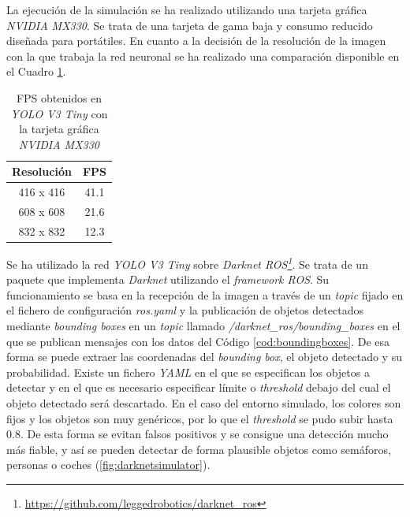 La ejecución de la simulación se ha realizado utilizando una tarjeta gráfica \textit{NVIDIA MX330}. Se trata de una tarjeta de gama baja y consumo reducido diseñada para portátiles. En cuanto a la decisión de la resolución de la imagen con la que trabaja la red neuronal se ha realizado una comparación disponible en el Cuadro \ref{table:versusnotebook}.\\

\begin{table}[H]
	\begin{center}
		\begin{tabular}{|c|c|}
			\hline
			\textbf{Resolución} & \textbf{FPS}
			\\
			\hline
			416 x 416           & 41.1
			\\
			608 x 608           & 21.6
			\\
			832 x 832           & 12.3
			\\
			\hline
		\end{tabular}
		\caption{FPS obtenidos en \textit{YOLO V3 Tiny} con la tarjeta gráfica \textit{NVIDIA MX330}}
		\label{table:versusnotebook}
	\end{center}
\end{table}

Se ha utilizado la red \textit{YOLO V3 Tiny} sobre \textit{Darknet ROS\footnote{\url{https://github.com/leggedrobotics/darknet_ros}}}. Se trata de un paquete que implementa \textit{Darknet} utilizando el \textit{framework ROS}. Su funcionamiento se basa en la recepción de la imagen a través de un \textit{topic} fijado en el fichero de configuración \textit{ros.yaml} y la publicación de objetos detectados mediante \textit{bounding boxes} en un \textit{topic} llamado \textit{/darknet\_ros/bounding\_boxes} en el que se publican mensajes con los datos del Código \ref{cod:boundingboxes}. De esa forma se puede extraer las coordenadas del \textit{bounding box}, el objeto detectado y su probabilidad. Existe un fichero \textit{YAML} en el que se especifican los objetos a detectar y en el que es necesario especificar límite o \textit{threshold} debajo del cual el objeto detectado será descartado. En el caso del entorno simulado, los colores son fijos y los objetos son muy genéricos, por lo que el \textit{threshold} se pudo subir hasta 0.8. De esta forma se evitan falsos positivos y se consigue una detección mucho más fiable, y así se pueden detectar de forma plausible objetos como semáforos, personas o coches (\ref{fig:darknetsimulator}).\\

